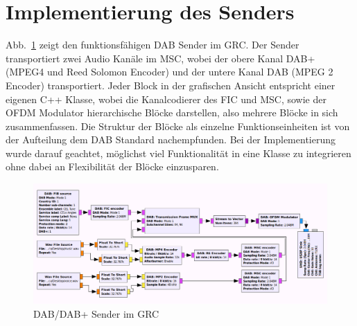 \section{Implementierung des Senders}
\label{sec:imp_des_transmitters}
Abb.~\ref{fig:transmitter} zeigt den funktionsfähigen DAB Sender im GRC. Der Sender transportiert zwei Audio Kanäle im MSC, wobei der obere Kanal DAB+ (MPEG4 und Reed Solomon Encoder) und der untere Kanal DAB (MPEG 2 Encoder) transportiert. Jeder Block in der grafischen Ansicht entspricht einer eigenen C++ Klasse, wobei die Kanalcodierer des FIC und MSC, sowie der OFDM Modulator hierarchische Blöcke darstellen, also mehrere Blöcke in sich zusammenfassen. Die Struktur der Blöcke als einzelne Funktionseinheiten ist von der Aufteilung dem DAB Standard nachempfunden. Bei der Implementierung wurde darauf geachtet, möglichst viel Funktionalität in eine Klasse zu integrieren ohne dabei an Flexibilität der Blöcke einzusparen.

\begin{figure}[ht]
\centering
  \includegraphics[width=\textwidth]{figures/GRC_transmitter.png}
	\caption{DAB/DAB+ Sender im GRC}
	\label{fig:transmitter}
\end{figure}

